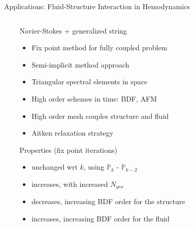 \documentclass[final,utf8,,hyperref={pdfpagelabels=false}]{beamer}
\begin{document}
\begin{frame}[containsverbatim]{}
\begin{columns}[t]
\begin{block}{Applications: Fluid-Structure Interaction in Hemodynamics}
\begin{columns}[c]
\begin{column}{.40\linewidth}
        
      \end{column}
      \begin{column}{.55\textwidth}
        \vspace{-2.5cm}
        \begin{block}{Navier-Stokes + generalized string}
          \begin{itemize}
	      \item Fix point method for fully coupled problem
	      \item Semi-implicit method approach
	      \item Triangular spectral elements in space
	      \item High order schemes in time: BDF, AFM
	      \item High order mesh couples structure and fluid
	      \item Aitken relaxation strategy
          \end{itemize}
        \end{block}
        \begin{block}{Properties (fix point iterations)}
          \begin{itemize}
	      \item unchanged wrt $k$, using $\mathbb P_k$ - $\mathbb P_{k-2}$
	      \item increases, with increased $N_{geo}$
	      \item decreases, increasing  BDF order for the structure
	      \item increases, increasing BDF order for the fluid
          \end{itemize}
        \end{block}
      \end{column}
    \end{columns}
  \end{block}

  \end{columns}
  \end{frame}





  
\end{document}

